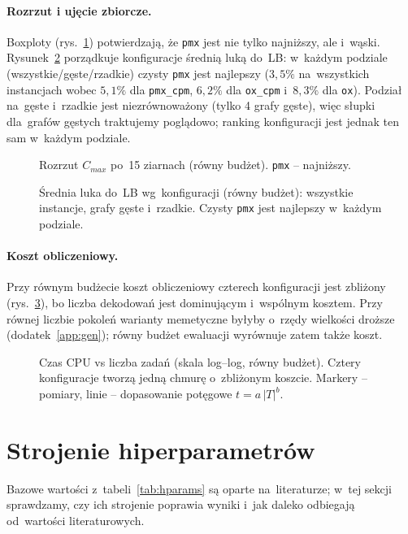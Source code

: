 \documentclass[pdflatex,sn-mathphys,Numbered]{sn-jnl}
\begin{document}
\paragraph{Rozrzut i ujęcie zbiorcze.}
Boxploty (rys.~\ref{fig:box}) potwierdzają, że \texttt{pmx} jest nie tylko
najniższy, ale i~wąski. Rysunek~\ref{fig:agg} porządkuje konfiguracje średnią luką
do~LB: w~każdym podziale (wszystkie/gęste/rzadkie) czysty \texttt{pmx} jest
najlepszy ($3{,}5\%$ na~wszystkich instancjach wobec $5{,}1\%$ dla \texttt{pmx\_cpm},
$6{,}2\%$ dla \texttt{ox\_cpm} i~$8{,}3\%$ dla \texttt{ox}). Podział na~gęste
i~rzadkie jest niezrównoważony (tylko 4 grafy gęste), więc słupki dla~grafów
gęstych traktujemy poglądowo; ranking konfiguracji jest jednak ten sam w~każdym
podziale.

\begin{figure}[H]
\centering

\caption{Rozrzut $C_{max}$ po~15 ziarnach (równy budżet). \texttt{pmx} -- najniższy.}
\label{fig:box}
\end{figure}

\begin{figure}[H]
\centering

\caption{Średnia luka do~LB wg~konfiguracji (równy budżet): wszystkie instancje,
grafy gęste i~rzadkie. Czysty \texttt{pmx} jest najlepszy w~każdym podziale.}
\label{fig:agg}
\end{figure}

\paragraph{Koszt obliczeniowy.}
Przy równym budżecie koszt obliczeniowy czterech konfiguracji jest zbliżony
(rys.~\ref{fig:cpuscatter}), bo liczba dekodowań jest dominującym i~wspólnym
kosztem. Przy równej liczbie pokoleń warianty memetyczne byłyby o~rzędy wielkości
droższe (dodatek~\ref{app:gen}); równy budżet ewaluacji wyrównuje zatem także koszt.

\begin{figure}[H]
\centering

\caption{Czas CPU vs liczba zadań (skala log--log, równy budżet). Cztery
konfiguracje tworzą jedną chmurę o~zbliżonym koszcie. Markery -- pomiary, linie --
dopasowanie potęgowe $t=a\,|T|^{b}$.}
\label{fig:cpuscatter}
\end{figure}

\section{Strojenie hiperparametrów}
\label{sec:tuning}
Bazowe wartości z~tabeli~\ref{tab:hparams} są oparte na~literaturze; w~tej sekcji
sprawdzamy, czy ich strojenie poprawia wyniki i~jak daleko odbiegają od~wartości
literaturowych.
\end{document}
